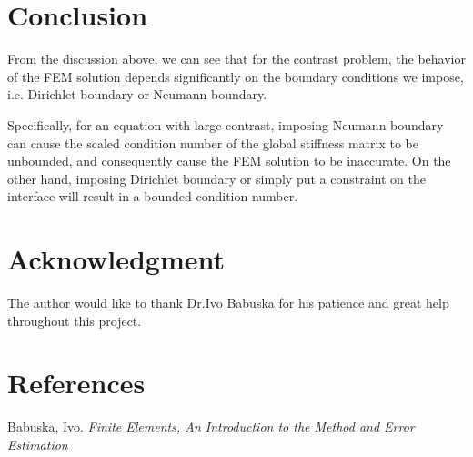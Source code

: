 \documentclass[12pt]{article}
\begin{document}
\section{Conclusion}
From the discussion above, we can see that for the contrast problem, the behavior of the FEM solution depends significantly on the boundary conditions we impose, i.e. Dirichlet boundary or Neumann boundary.

Specifically, for an equation with large contrast, imposing Neumann boundary can cause the scaled condition number of the global stiffness matrix to be unbounded, and consequently cause the FEM solution to be inaccurate. On the other hand, imposing Dirichlet boundary or simply put a constraint on the interface will result in a bounded condition number.

\section*{Acknowledgment}
The author would like to thank Dr.Ivo Babuska for his patience and great help throughout this  project.

\section*{References}
Babuska, Ivo. \textit{Finite Elements, An Introduction to the Method and Error Estimation}
\end{document}
